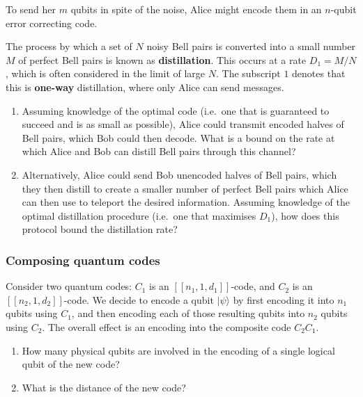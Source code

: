 \documentclass[fleqn,a4paper]{article}
\providecommand{\tightlist}{\setlength{\itemsep}{0pt}\setlength{\parskip}{0pt}}
\newenvironment{idea}{\everypar{\setlength{\parindent}{1.5em}}}{}
\theoremstyle{definition}
\theoremstyle{definition}
\theoremstyle{definition}
\theoremstyle{definition}
\theoremstyle{remark}
\begin{document}
To send her \(m\) qubits in spite of the noise, Alice might encode them in an \(n\)-qubit error correcting code.

\begin{idea}
The process by which a set of \(N\) noisy Bell pairs is converted into a small number \(M\) of perfect Bell pairs is known as \textbf{distillation}.
This occurs at a rate \(D_1=M/N\), which is often considered in the limit of large \(N\).
The subscript \(1\) denotes that this is \textbf{one-way} distillation, where only Alice can send messages.

\end{idea}

\begin{enumerate}
\def\labelenumi{\arabic{enumi}.}
\item
  Assuming knowledge of the optimal code (i.e.~one that is guaranteed to succeed and is as small as possible), Alice could transmit encoded halves of Bell pairs, which Bob could then decode.
  What is a bound on the rate at which Alice and Bob can distill Bell pairs through this channel?
\item
  Alternatively, Alice could send Bob unencoded halves of Bell pairs, which they then distill to create a smaller number of perfect Bell pairs which Alice can then use to teleport the desired information.
  Assuming knowledge of the optimal distillation procedure (i.e.~one that maximises \(D_1\)), how does this protocol bound the distillation rate?
\end{enumerate}

\hypertarget{composing-quantum-codes}{%
\subsubsection{Composing quantum codes}\label{composing-quantum-codes}}

Consider two quantum codes: \(C_1\) is an \([[n_1,1,d_1]]\)-code, and \(C_2\) is an \([[n_2,1,d_2]]\)-code.
We decide to encode a qubit \(|\psi\rangle\) by first encoding it into \(n_1\) qubits using \(C_1\), and then encoding each of those resulting qubits into \(n_2\) qubits using \(C_2\).
The overall effect is an encoding into the composite code \(C_2C_1\).

\begin{enumerate}
\def\labelenumi{\arabic{enumi}.}
\tightlist
\item
  How many physical qubits are involved in the encoding of a single logical qubit of the new code?
\item
  What is the distance of the new code?
\end{enumerate}
\end{document}
